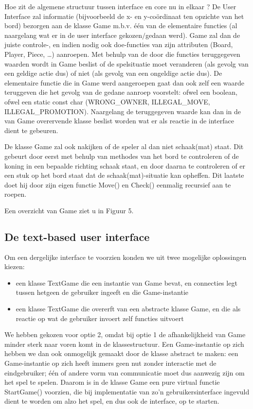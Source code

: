 \documentclass[a4paper,11pt,oneside, titlepage]{article}
\begin{document}
Hoe zit de algemene structuur tussen interface en core nu in elkaar ?
De User Interface zal informatie (bijvoorbeeld de x- en y-co\"ordinaat ten opzichte van het bord) bezorgen aan de klasse Game m.b.v. \'e\'en van de elementaire functies (al naargelang wat er in de user interface gekozen$/$gedaan werd). Game zal dan de juiste controle-, en indien nodig ook doe-functies van zijn attributen (Board, Player, Piece, \ldots) aanroepen. Met behulp van de door die functies teruggegeven waarden wordt in Game beslist of de spelsituatie moet veranderen (als gevolg van een geldige actie dus) of niet (als gevolg van een ongeldige actie dus). De elementaire functie die in Game werd aangeroepen gaat dan ook zelf een waarde teruggeven die het gevolg van de gedane aanroep voorstelt: ofwel een boolean, ofwel een static const char (WRONG\_OWNER, ILLEGAL\_MOVE, ILLEGAL\_PROMOTION). Naargelang de teruggegeven waarde kan dan in de van Game overervende klasse beslist worden wat er als reactie in de interface dient te gebeuren.

De klasse Game zal ook nakijken of de speler al dan niet schaak(mat) staat. Dit gebeurt door eerst met behulp van methodes van het bord te controleren of de koning in een bepaalde richting schaak staat, en door daarna te controleren of er een stuk op het bord staat dat de schaak(mat)-situatie kan opheffen. Dit laatste doet hij door zijn eigen functie Move() en Check() eenmalig recursief aan te roepen. 

Een overzicht van Game ziet u in Figuur 5.
\subsection{De text-based user interface}
Om een dergelijke interface te voorzien konden we uit twee mogelijke oplossingen kiezen:
	\begin{itemize}
		\item een klasse TextGame die een instantie van Game bevat, en connecties legt tussen hetgeen de gebruiker ingeeft en die Game-instantie 
		\item een klasse TextGame die overerft van een abstracte klasse Game, en die als reactie op wat de gebruiker invoert zelf functies uitvoert
 	\end{itemize}
We hebben gekozen voor optie 2, omdat bij optie 1 de afhankelijkheid van Game minder sterk naar voren komt in de klassestructuur. Een Game-instantie op zich hebben we dan ook onmogelijk gemaakt door de klasse abstract te maken: een Game-instantie op zich heeft immers geen nut zonder interactie met de eindgebruiker; \'e\'en of andere vorm van communicatie moet dus aanwezig zijn om het spel te spelen. Daarom is in de klasse Game een pure virtual functie StartGame() voorzien, die bij implementatie van zo'n gebruikersinterface ingevuld dient te worden om alzo het spel, en dus ook de interface, op te starten.
\end{document}
